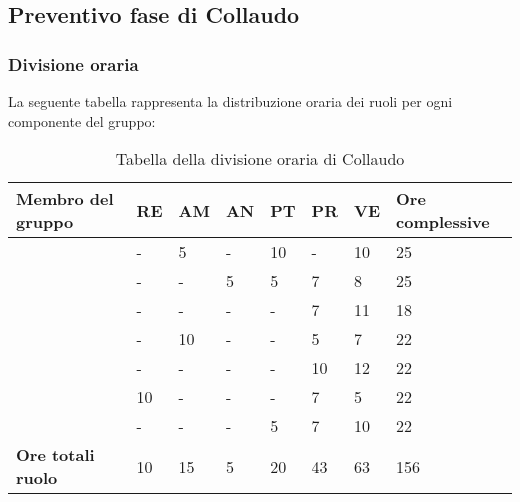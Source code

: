 \subsection{Preventivo fase di Collaudo}

\subsubsection{Divisione oraria}
La seguente tabella rappresenta la distribuzione oraria dei ruoli per ogni componente del gruppo:
{

\renewcommand{\arraystretch}{2}
\begin{longtable}[h!] { C{4cm} C{1cm} C{1cm} C{1cm} C{1cm} C{1cm} C{1cm} C{3cm}}
\caption{Tabella della divisione oraria di Collaudo}	\\
\rowcolor{\primaryColor}

\textcolor{\secondaryColor}{\textbf{Membro del gruppo}} & 
\textcolor{\secondaryColor}{\textbf{RE}} & 
\textcolor{\secondaryColor}{\textbf{AM}} & 
\textcolor{\secondaryColor}{\textbf{AN}} & 
\textcolor{\secondaryColor}{\textbf{PT}} & 
\textcolor{\secondaryColor}{\textbf{PR}} & 
\textcolor{\secondaryColor}{\textbf{VE}} & 
\textcolor{\secondaryColor}{\textbf{Ore complessive}}\\	
\endhead

\AW{}                     &  - &  5 &  - & 10 & - & 10 & 25 \\
\AT{}                     &  - &  - &  5 & 5 & 7 & 8 & 25 \\
\AD{}                     &  - &  - &  - & - & 7 & 11 & 18 \\
\EC{}                     &  - &  10 &  - & - & 5 & 7 & 22 \\
\EM{}                     &  - &  - &  - & - & 10 & 12 & 22 \\
\FP{}                     & 10 & - &  - & - & 7 & 5 & 22 \\
\GG{}                     &  - &  - &  - & 5 & 7 & 10 & 22 \\
\textbf{Ore totali ruolo} & 10 & 15 & 5 & 20 & 43 & 63 & 156 \\

\end{longtable}
}


